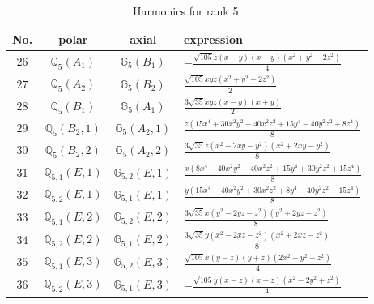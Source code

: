 \documentclass[fleqn,8pt,landscape]{jsarticle}
\begin{document}
\begin{table}[ht!]
\begin{center}
\caption{Harmonics for rank 5.}
\renewcommand{\arraystretch}{1.3}
\begin{tabular}{cccl} \hline \hline
No. & polar & axial & expression \\ \hline
$ 26 $ & $ \mathbb{Q}_{5}(A_{1}) $ & $ \mathbb{G}_{5}(B_{1}) $ & $ - \frac{\sqrt{105} z \left(x - y\right) \left(x + y\right) \left(x^{2} + y^{2} - 2 z^{2}\right)}{4} $ \\
$ 27 $ & $ \mathbb{Q}_{5}(A_{2}) $ & $ \mathbb{G}_{5}(B_{2}) $ & $ \frac{\sqrt{105} x y z \left(x^{2} + y^{2} - 2 z^{2}\right)}{2} $ \\
$ 28 $ & $ \mathbb{Q}_{5}(B_{1}) $ & $ \mathbb{G}_{5}(A_{1}) $ & $ \frac{3 \sqrt{35} x y z \left(x - y\right) \left(x + y\right)}{2} $ \\
$ 29 $ & $ \mathbb{Q}_{5}(B_{2},1) $ & $ \mathbb{G}_{5}(A_{2},1) $ & $ \frac{z \left(15 x^{4} + 30 x^{2} y^{2} - 40 x^{2} z^{2} + 15 y^{4} - 40 y^{2} z^{2} + 8 z^{4}\right)}{8} $ \\
$ 30 $ & $ \mathbb{Q}_{5}(B_{2},2) $ & $ \mathbb{G}_{5}(A_{2},2) $ & $ \frac{3 \sqrt{35} z \left(x^{2} - 2 x y - y^{2}\right) \left(x^{2} + 2 x y - y^{2}\right)}{8} $ \\
$ 31 $ & $ \mathbb{Q}_{5,1}(E,1) $ & $ \mathbb{G}_{5,2}(E,1) $ & $ \frac{x \left(8 x^{4} - 40 x^{2} y^{2} - 40 x^{2} z^{2} + 15 y^{4} + 30 y^{2} z^{2} + 15 z^{4}\right)}{8} $ \\
$ 32 $ & $ \mathbb{Q}_{5,2}(E,1) $ & $ \mathbb{G}_{5,1}(E,1) $ & $ \frac{y \left(15 x^{4} - 40 x^{2} y^{2} + 30 x^{2} z^{2} + 8 y^{4} - 40 y^{2} z^{2} + 15 z^{4}\right)}{8} $ \\
$ 33 $ & $ \mathbb{Q}_{5,1}(E,2) $ & $ \mathbb{G}_{5,2}(E,2) $ & $ \frac{3 \sqrt{35} x \left(y^{2} - 2 y z - z^{2}\right) \left(y^{2} + 2 y z - z^{2}\right)}{8} $ \\
$ 34 $ & $ \mathbb{Q}_{5,2}(E,2) $ & $ \mathbb{G}_{5,1}(E,2) $ & $ \frac{3 \sqrt{35} y \left(x^{2} - 2 x z - z^{2}\right) \left(x^{2} + 2 x z - z^{2}\right)}{8} $ \\
$ 35 $ & $ \mathbb{Q}_{5,1}(E,3) $ & $ \mathbb{G}_{5,2}(E,3) $ & $ \frac{\sqrt{105} x \left(y - z\right) \left(y + z\right) \left(2 x^{2} - y^{2} - z^{2}\right)}{4} $ \\
$ 36 $ & $ \mathbb{Q}_{5,2}(E,3) $ & $ \mathbb{G}_{5,1}(E,3) $ & $ - \frac{\sqrt{105} y \left(x - z\right) \left(x + z\right) \left(x^{2} - 2 y^{2} + z^{2}\right)}{4} $ \\
 \hline \hline
\end{tabular}
\end{center}
\end{table}
\end{document}
